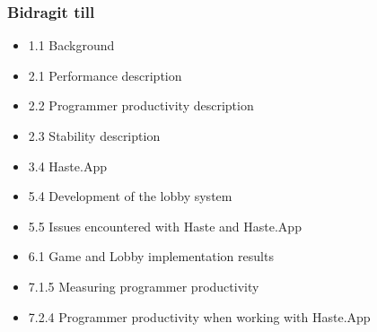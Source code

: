 \subsubsection{Bidragit till}
\begin{itemize}
    \item 1.1 Background
    \item 2.1 Performance description
    \item 2.2 Programmer productivity description
    \item 2.3 Stability description
    \item 3.4 Haste.App
    \item 5.4 Development of the lobby system
    \item 5.5 Issues encountered with Haste and Haste.App
    \item 6.1 Game and Lobby implementation results
    \item 7.1.5 Measuring programmer productivity
    \item 7.2.4 Programmer productivity when working with Haste.App
\end{itemize}